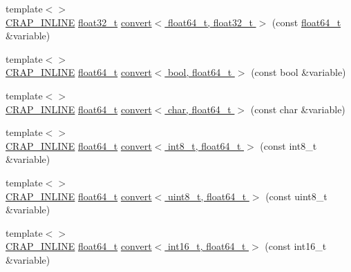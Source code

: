 \begin{DoxyCompactItemize}
{\footnotesize template$<$$>$ }\\\hyperlink{config__x86_8h_a5a40526b8d842e7ff731509998bb0f1c}{C\+R\+A\+P\+\_\+\+I\+N\+L\+I\+N\+E} \hyperlink{crap__types_8h_a4611b605e45ab401f02cab15c5e38715}{float32\+\_\+t} \hyperlink{namespacecrap_aaf3c16d6739ac5fc4759053ea3f1cff8}{convert$<$ float64\+\_\+t, float32\+\_\+t $>$} (const \hyperlink{crap__types_8h_ac55f3ae81b5bc9053760baacf57e47f4}{float64\+\_\+t} \&variable)
\item 
{\footnotesize template$<$$>$ }\\\hyperlink{config__x86_8h_a5a40526b8d842e7ff731509998bb0f1c}{C\+R\+A\+P\+\_\+\+I\+N\+L\+I\+N\+E} \hyperlink{crap__types_8h_ac55f3ae81b5bc9053760baacf57e47f4}{float64\+\_\+t} \hyperlink{namespacecrap_afbb4cead12dd3392415830ee6cb2e083}{convert$<$ bool, float64\+\_\+t $>$} (const bool \&variable)
\item 
{\footnotesize template$<$$>$ }\\\hyperlink{config__x86_8h_a5a40526b8d842e7ff731509998bb0f1c}{C\+R\+A\+P\+\_\+\+I\+N\+L\+I\+N\+E} \hyperlink{crap__types_8h_ac55f3ae81b5bc9053760baacf57e47f4}{float64\+\_\+t} \hyperlink{namespacecrap_ae0246250ddc72c1835153f97999602e4}{convert$<$ char, float64\+\_\+t $>$} (const char \&variable)
\item 
{\footnotesize template$<$$>$ }\\\hyperlink{config__x86_8h_a5a40526b8d842e7ff731509998bb0f1c}{C\+R\+A\+P\+\_\+\+I\+N\+L\+I\+N\+E} \hyperlink{crap__types_8h_ac55f3ae81b5bc9053760baacf57e47f4}{float64\+\_\+t} \hyperlink{namespacecrap_a3abb463a5f5089e01e57c001dd85848a}{convert$<$ int8\+\_\+t, float64\+\_\+t $>$} (const int8\+\_\+t \&variable)
\item 
{\footnotesize template$<$$>$ }\\\hyperlink{config__x86_8h_a5a40526b8d842e7ff731509998bb0f1c}{C\+R\+A\+P\+\_\+\+I\+N\+L\+I\+N\+E} \hyperlink{crap__types_8h_ac55f3ae81b5bc9053760baacf57e47f4}{float64\+\_\+t} \hyperlink{namespacecrap_afdb5fc94fcd1aa7a7ba2ba024c1d5cd3}{convert$<$ uint8\+\_\+t, float64\+\_\+t $>$} (const uint8\+\_\+t \&variable)
\item 
{\footnotesize template$<$$>$ }\\\hyperlink{config__x86_8h_a5a40526b8d842e7ff731509998bb0f1c}{C\+R\+A\+P\+\_\+\+I\+N\+L\+I\+N\+E} \hyperlink{crap__types_8h_ac55f3ae81b5bc9053760baacf57e47f4}{float64\+\_\+t} \hyperlink{namespacecrap_afe51c56a156af2a8b9b95a31e9b1c3ad}{convert$<$ int16\+\_\+t, float64\+\_\+t $>$} (const int16\+\_\+t \&variable)
\item 

\end{DoxyCompactItemize}
